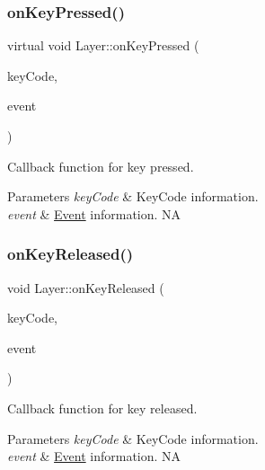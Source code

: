 \subsubsection{\texorpdfstring{on\+Key\+Pressed()}{onKeyPressed()}\hspace{0.1cm}{\footnotesize\ttfamily [2/2]}}
{\footnotesize\ttfamily virtual void Layer\+::on\+Key\+Pressed (\begin{DoxyParamCaption}\item[{\hyperlink{classEventKeyboard_a7cd3fa46515673276ce8ec7f0e051606}{Event\+Keyboard\+::\+Key\+Code}}]{key\+Code,  }\item[{\hyperlink{classEvent}{Event} $\ast$}]{event }\end{DoxyParamCaption})\hspace{0.3cm}{\ttfamily [virtual]}}

Callback function for key pressed. 
\begin{DoxyParams}{Parameters}
{\em key\+Code} & Key\+Code information. \\
\hline
{\em event} & \hyperlink{classEvent}{Event} information.  NA \\
\hline
\end{DoxyParams}
\mbox{\label{classLayer_a5d382621487e2df6726084535071daca}} 
\subsubsection{\texorpdfstring{on\+Key\+Released()}{onKeyReleased()}\hspace{0.1cm}{\footnotesize\ttfamily [1/2]}}
{\footnotesize\ttfamily void Layer\+::on\+Key\+Released (\begin{DoxyParamCaption}\item[{\hyperlink{classEventKeyboard_a7cd3fa46515673276ce8ec7f0e051606}{Event\+Keyboard\+::\+Key\+Code}}]{key\+Code,  }\item[{\hyperlink{classEvent}{Event} $\ast$}]{event }\end{DoxyParamCaption})\hspace{0.3cm}{\ttfamily [virtual]}}

Callback function for key released. 
\begin{DoxyParams}{Parameters}
{\em key\+Code} & Key\+Code information. \\
\hline
{\em event} & \hyperlink{classEvent}{Event} information.  NA \\
\hline
\end{DoxyParams}
\mbox{\label{classLayer_a2b6862d65f1d0d318b1340394ddade96}} 
